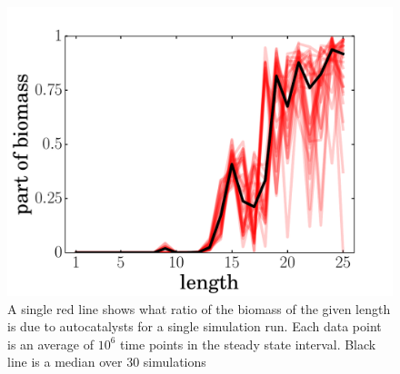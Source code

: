 \documentclass[journal=jacsat,manuscript=article,layout=twocolumn]{achemso}
\begin{document}
\begin{figure}[h!]
  \centering
  \includegraphics[width=\columnwidth]{pictures/biomass.pdf} 
  \caption{\footnotesize{A single red line shows what ratio of the biomass of the 
given length is due to autocatalysts for a single simulation run. Each data point is an average of 
$10^6$ time points in the steady state interval. Black line is a median over 30 simulations }}
  \label{fig:biomass}
\end{figure}
\end{document}
